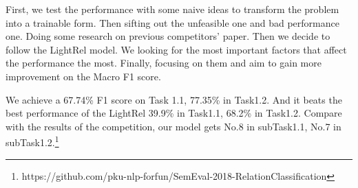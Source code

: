 First, we test the performance with some naive ideas to transform the problem into a trainable form. Then sifting out the unfeasible one and bad performance one. Doing some research on previous competitors' paper. Then we decide to follow the LightRel model. We looking for the most important factors that affect the performance the most. Finally, focusing on them and aim to gain more improvement on the Macro F1 score.

We achieve a 67.74\% F1 score on Task 1.1, 77.35\% in Task1.2. And it beats the best performance of the LightRel 39.9\% in Task1.1, 68.2\% in Task1.2. Compare with the results of the competition, our model gets No.8 in subTask1.1, No.7 in subTask1.2.\footnote{https://github.com/pku-nlp-forfun/SemEval-2018-RelationClassification}